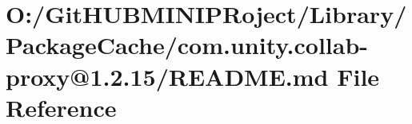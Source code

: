 \hypertarget{_library_2_package_cache_2com_8unity_8collab-proxy_0D1_82_815_2_r_e_a_d_m_e_8md}{}\section{O\+:/\+Git\+H\+U\+B\+M\+I\+N\+I\+P\+Roject/\+Library/\+Package\+Cache/com.unity.\+collab-\/proxy@1.2.15/\+R\+E\+A\+D\+ME.md File Reference}
\label{_library_2_package_cache_2com_8unity_8collab-proxy_0D1_82_815_2_r_e_a_d_m_e_8md}

